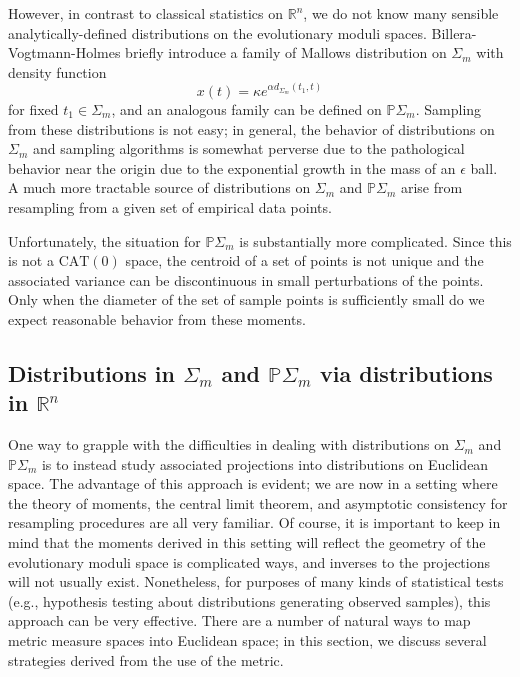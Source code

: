\documentclass[a4paper,11pt]{article}
\newcommand{\CAT}{\textrm{CAT}}
\begin{document}
However, in contrast to classical statistics on $\mathbb{R}^n$, we do
not know many sensible analytically-defined distributions on the
evolutionary moduli spaces.  Billera-Vogtmann-Holmes briefly introduce
a family of Mallows distribution on $\Sigma_m$ with density function
\[
x(t) = \kappa e^{\alpha d_{\Sigma_m}(t_1, t)}
\] 
for fixed $t_1 \in \Sigma_m$, and an analogous family can be defined
on $\mathbb{P}\Sigma_m$.  Sampling from these distributions is not
easy; in general, the behavior of distributions on $\Sigma_m$ and
sampling algorithms is somewhat perverse due to the pathological
behavior near the origin due to the exponential growth in the mass of
an $\epsilon$ ball.  A much more tractable source of distributions on
$\Sigma_m$ and $\mathbb{P}\Sigma_m$ arise from resampling from a given
set of empirical data points.

Unfortunately, the situation for $\mathbb{P}\Sigma_m$ is substantially
more complicated.  Since this is not a $\CAT(0)$ space, the centroid
of a set of points is not unique and the associated variance can be
discontinuous in small perturbations of the points.  Only when the
diameter of the set of sample points is sufficiently small do we
expect reasonable behavior from these moments.

\subsection{Distributions in $\Sigma_m$ and $\mathbb{P}\Sigma_m$ via distributions in $\mathbb{R}^n$}

One way to grapple with the difficulties in dealing with distributions on $\Sigma_m$ and $\mathbb{P}\Sigma_m$ is to instead study associated projections into distributions on Euclidean space.
The advantage of this approach is evident; we are now in a setting where the theory of moments, the central limit theorem, and asymptotic consistency for resampling procedures are all very familiar.
Of course, it is important to keep in mind that the moments derived in this setting will reflect the geometry of the evolutionary moduli space is complicated ways, and inverses to the projections will not usually exist.
Nonetheless, for purposes of many kinds of statistical tests (e.g., hypothesis testing about distributions generating observed samples), this approach can be very effective.
There are a number of natural ways to map metric measure spaces into Euclidean space; in this section, we discuss several strategies derived from the use of the metric.
\end{document}
